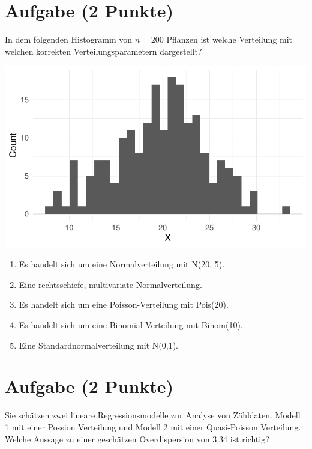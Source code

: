 \documentclass[a4paper, 9pt]{scrartcl}\usepackage[]{graphicx}\usepackage[]{xcolor}
\makeatletter
\def\maxwidth{ %
  \ifdim\Gin@nat@width>\linewidth
    \linewidth
  \else
    \Gin@nat@width
  \fi
}
\makeatother
\begin{document}
\section{Aufgabe \hfill (2 Punkte)}

In dem folgenden Histogramm von $n = 200$ Pflanzen ist welche Verteilung
mit welchen korrekten Verteilungsparametern dargestellt?



{\centering \includegraphics[width=\maxwidth]{img/mc-distribution-02-a-1} 

}







\begin{enumerate}
\item [\textbf{A} \msquare] Es handelt sich um eine Normalverteilung mit N(20, 5).
\item [\textbf{B} \msquare] Eine rechtsschiefe, multivariate Normalverteilung.
\item [\textbf{C} \msquare] Es handelt sich um eine Poisson-Verteilung mit Pois(20).
\item [\textbf{D} \msquare] Es handelt sich um eine Binomial-Verteilung mit Binom(10).
\item [\textbf{E} \msquare] Eine Standardnormalverteilung mit N(0,1).
\end{enumerate} 

\section{Aufgabe \hfill (2 Punkte)}



Sie sch{\"a}tzen zwei lineare Regressionsmodelle zur Analyse von
Z{\"a}hldaten. Modell 1 mit einer Possion Verteilung und Modell 2 mit einer
Quasi-Poisson Verteilung. Welche Aussage zu einer gesch{\"a}tzen Overdispersion
von 3.34 ist richtig?
\end{document}
